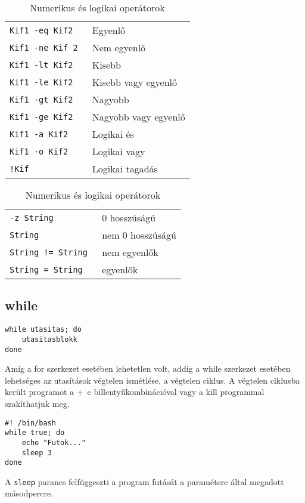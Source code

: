 \begin{table}[!ht]
\centering
 \begin{tabular}{|ll|}
          \hline
\tt Kif1 -eq Kif2	& Egyenlő
\\
\tt Kif1 -ne Kif 2	& Nem egyenlő
\\
\tt Kif1 -lt Kif2	& Kisebb
\\
\tt Kif1 -le Kif2	& Kisebb vagy egyenlő
\\
\tt Kif1 -gt Kif2	& Nagyobb
\\
\tt Kif1 -ge Kif2	& Nagyobb vagy egyenlő
\\
\hline
\tt Kif1 -a Kif2	& Logikai és
\\
\tt Kif1 -o Kif2	& Logikai vagy
\\
\tt !Kif		& Logikai tagadás
\\
\hline
  \end{tabular}
\caption{Numerikus és logikai operátorok}
\medskip
\centering
 \begin{tabular}{|ll|}
          \hline
\tt -z String		& 0 hosszúságú
\\
\tt String			& nem 0 hosszúságú
\\
\tt String != String	& nem egyenlők
\\
\tt String = String		& egyenlők
\\
\hline
  \end{tabular}
\caption{Numerikus és logikai operátorok}
\end{table}

\vfill\pagebreak

\subsection{while}

\begin{lstlisting}
while utasitas; do
    utasitasblokk
done
\end{lstlisting}

Amíg a for szerkezet esetében lehetetlen volt, addig a while szerkezet esetében lehetséges az
utasítások végtelen ismétlése, a végtelen ciklus. A végtelen ciklusba került programot a
\Ctrl+\ c billentyűkombinációval vagy a kill programmal szakíthatjuk meg.\bigskip


\begin{lstlisting}
#! /bin/bash
while true; do
    echo "Futok..."
    sleep 3
done
\end{lstlisting}
A \texttt{sleep} parancs felfüggeszti a program futását a paramétere által megadott másodpercre.



